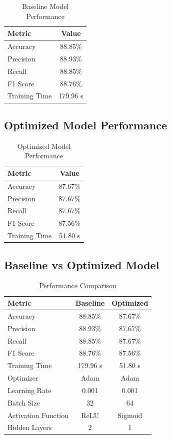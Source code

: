 \documentclass[12pt,a4paper]{article}
\begin{document}
\begin{table}[H]
\centering
\caption{Baseline Model Performance}
\begin{tabular}{lc}
\toprule
Metric & Value\\
\midrule
Accuracy & 88.85\%\\
Precision & 88.93\%\\
Recall & 88.85\%\\
F1 Score & 88.76\%\\
Training Time & 179.96 s\\
\bottomrule
\end{tabular}
\end{table}

\subsection{Optimized Model Performance}

\begin{table}[H]
\centering
\caption{Optimized Model Performance}
\begin{tabular}{lc}
\toprule
Metric & Value\\
\midrule
Accuracy & 87.67\%\\
Precision & 87.67\%\\
Recall & 87.67\%\\
F1 Score & 87.56\%\\
Training Time & 51.80 s\\
\bottomrule
\end{tabular}
\end{table}

\subsection{Baseline vs Optimized Model}

\begin{table}[H]
\centering
\caption{Performance Comparison}
\begin{tabular}{lcc}
\toprule
Metric & Baseline & Optimized\\
\midrule
Accuracy & 88.85\% & 87.67\%\\
Precision & 88.93\% & 87.67\%\\
Recall & 88.85\% & 87.67\%\\
F1 Score & 88.76\% & 87.56\%\\
Training Time & 179.96 s & 51.80 s\\
Optimizer & Adam & Adam\\
Learning Rate & 0.001 & 0.001\\
Batch Size & 32 & 64\\
Activation Function & ReLU & Sigmoid\\
Hidden Layers & 2 & 1\\
\bottomrule
\end{tabular}
\end{table}
\end{document}
